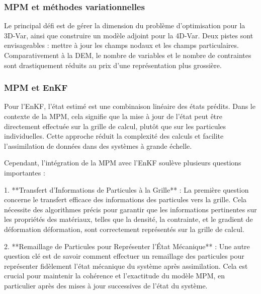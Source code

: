 \subsubsection{MPM et méthodes variationnelles}
Le principal défi est de gérer la dimension du problème d'optimisation pour la 3D-Var, ainsi que construire un modèle adjoint pour la 4D-Var.
Deux pistes sont envisageables : mettre à jour les champs nodaux et les champs particulaires. Comparativement à la DEM, le nombre de variables et le nombre de contraintes sont drastiquement réduits au prix d'une représentation plus grossière.

\subsubsection{MPM et EnKF}
Pour l'EnKF, l'état estimé est une combinaison linéaire des états prédits. Dans le contexte de la MPM, cela signifie que la mise à jour de l'état peut être directement effectuée sur la grille de calcul, plutôt que sur les particules individuelles. Cette approche réduit la complexité des calculs et facilite l'assimilation de données dans des systèmes à grande échelle.

Cependant, l'intégration de la MPM avec l'EnKF soulève plusieurs questions importantes :

1. **Transfert d'Informations de Particules à la Grille** : La première question concerne le transfert efficace des informations des particules vers la grille. Cela nécessite des algorithmes précis pour garantir que les informations pertinentes sur les propriétés des matériaux, telles que la densité, la contrainte, et le gradient de déformation déformation, sont correctement représentés sur la grille de calcul.

2. **Remaillage de Particules pour Représenter l'État Mécanique** : Une autre question clé est de savoir comment effectuer un remaillage des particules pour représenter fidèlement l'état mécanique du système après assimilation. Cela est crucial pour maintenir la cohérence et l'exactitude du modèle MPM, en particulier après des mises à jour successives de l'état du système.


